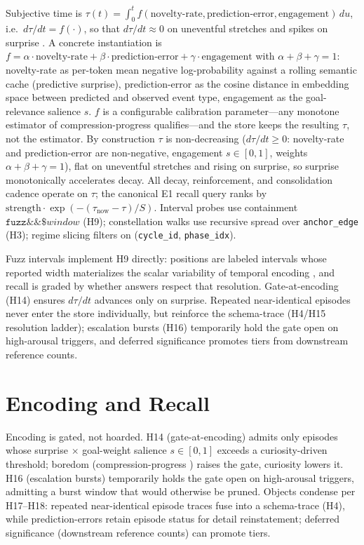 \documentclass[letterpaper]{article}
\begin{document}
Subjective time is $\tau(t)=\int_{0}^{t} f(\text{novelty-rate}, \text{prediction-error}, \text{engagement})\,du$, i.e.\ $d\tau/dt = f(\cdot)$, so that $d\tau/dt\approx 0$ on uneventful stretches and spikes on surprise \citep{schmidhuber1991curiosity}. A concrete instantiation is $f = \alpha\cdot\text{novelty-rate} + \beta\cdot\text{prediction-error} + \gamma\cdot\text{engagement}$ with $\alpha+\beta+\gamma=1$: novelty-rate as per-token mean negative log-probability against a rolling semantic cache (predictive surprise), prediction-error as the cosine distance in embedding space between predicted and observed event type, engagement as the goal-relevance salience $s$. $f$ is a configurable calibration parameter---any monotone estimator of compression-progress qualifies---and the store keeps the resulting $\tau$, not the estimator. By construction $\tau$ is non-decreasing ($d\tau/dt \ge 0$: novelty-rate and prediction-error are non-negative, engagement $s\in[0,1]$, weights $\alpha+\beta+\gamma=1$), flat on uneventful stretches and rising on surprise, so surprise monotonically accelerates decay. All decay, reinforcement, and consolidation cadence operate on $\tau$; the canonical E1 recall query ranks by $\text{strength}\cdot \exp(-(\tau_{\text{now}}-\tau)/S)$. Interval probes use containment $\texttt{fuzz} \&\& \$window$ (H9); constellation walks use recursive spread over \texttt{anchor\_edge} (H3); regime slicing filters on (\texttt{cycle\_id}, \texttt{phase\_idx}).

Fuzz intervals implement H9 directly: positions are labeled intervals whose reported width materializes the scalar variability of temporal encoding \citep{gibbon1977scalar}, and recall is graded by whether answers respect that resolution. Gate-at-encoding (H14) ensures $d\tau/dt$ advances only on surprise. Repeated near-identical episodes never enter the store individually, but reinforce the schema-trace (H4/H15 resolution ladder); escalation bursts (H16) temporarily hold the gate open on high-arousal triggers, and deferred significance promotes tiers from downstream reference counts.

\section{Encoding and Recall}
Encoding is gated, not hoarded. H14 (gate-at-encoding) admits only episodes whose surprise $\times$ goal-weight salience $s\in[0,1]$ exceeds a curiosity-driven threshold; boredom (compression-progress \citep{schmidhuber1991curiosity}) raises the gate, curiosity lowers it. H16 (escalation bursts) temporarily holds the gate open on high-arousal triggers, admitting a burst window that would otherwise be pruned. Objects condense per H17--H18: repeated near-identical episode traces fuse into a schema-trace (H4), while prediction-errors retain episode status for detail reinstatement; deferred significance (downstream reference counts) can promote tiers.
\end{document}
